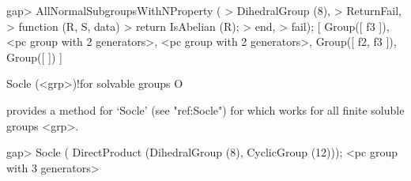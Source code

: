 \beginexample
gap> AllNormalSubgroupsWithNProperty (
> DihedralGroup (8),
>     ReturnFail,
>     function (R, S, data)
>         return IsAbelian (R);
>     end,
>     fail);
[ Group([ f3 ]), <pc group with 2 generators>, <pc group with 2 generators>,
  Group([ f2, f3 ]), Group([  ]) ]
\endexample


\>Socle (<grp>)!{for solvable groups} O

{\CRISP} provides a method for `Socle' (see "ref:Socle") for which works for 
all finite soluble groups <grp>.

\beginexample
gap> Socle ( DirectProduct (DihedralGroup (8), CyclicGroup (12)));
<pc group with 3 generators>
\endexample


